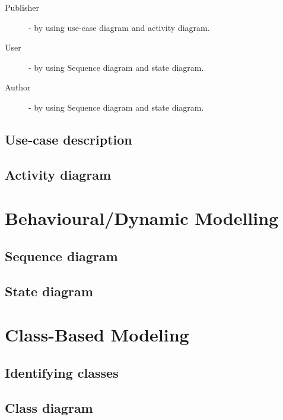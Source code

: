 	\begin{description}
		\item[Publisher] - by using use-case diagram and activity diagram.
		\item[User] - by using Sequence diagram and state diagram.
		\item[Author] - by using Sequence diagram and state diagram.
	\end{description}

	\subsection{Use-case description}
	\subsection{Activity diagram}

\section{Behavioural/Dynamic Modelling}
	\subsection{Sequence diagram}
	\subsection{State diagram}

\section{Class-Based Modeling}
	\subsection{Identifying classes}
	\subsection{Class diagram}
